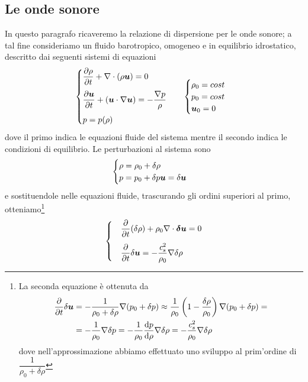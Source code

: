 \subsection{Le onde sonore} \label{sec:OndeSonore}
In questo paragrafo ricaveremo la relazione di dispersione per le onde sonore; a tal fine consideriamo un fluido barotropico, omogeneo e in equilibrio idrostatico, descritto dai seguenti sistemi di equazioni
\begin{align*}
&\begin{cases}
\derP{\rho}{t} + \Div (\rho \V{u}) =0 \\[10pt]
\derP{\V{u}}{t} + (\scal{u}{\nabla}\V{u}) = -\dfrac{\V{\nabla}p}{\rho} \\[10pt]
p = p(\rho)
\end{cases}
&\begin{cases}
\rho_0 = cost \\
p_0 = cost \\
\V{u}_0 = 0
\end{cases}
\end{align*}
dove il primo indica le equazioni fluide del sistema mentre il secondo indica le condizioni di equilibrio. Le perturbazioni al sistema sono
\begin{align*}
\begin{cases}
\rho = \rho_0 + \delta\rho \\
p = p_0 + \delta p
\V{u} = \delta \V{u}
\end{cases}
\end{align*}
e sostituendole nelle equazioni fluide, trascurando gli ordini superiori al primo, otteniamo\footnote{La seconda equazione è ottenuta da \begin{align*}
\derP{}{t} \delta\V{u} &= -\dfrac{1}{\rho_0+\delta\rho} \Grad (p_0 +\delta p) \approx \frac{1}{\rho_0} \left( 1-\dfrac{\delta \rho}{\rho_0} \right) \Grad (p_0 + \delta p) = \\
&= -\dfrac{1}{\rho_0} \Grad \delta p = -\dfrac{1}{\rho_0} \der{p}{\rho} \Grad \delta \rho = -\dfrac{\sound^2}{\rho_0}\Grad\delta\rho
\end{align*} dove nell'approssimazione abbiamo effettuato uno sviluppo al prim'ordine di $\dfrac{1}{\rho_0+\delta\rho}$}
\begin{align}
\begin{cases}
&\derP{}{t}(\delta\rho) + \rho_0 \Div \delta\V{u} = 0 \\[10pt] \label{eq:Perturbazioni}
&\derP{}{t} \delta\V{u} = -\dfrac{\sound^2}{\rho_0}\Grad\delta\rho 
\end{cases}
\end{align}
